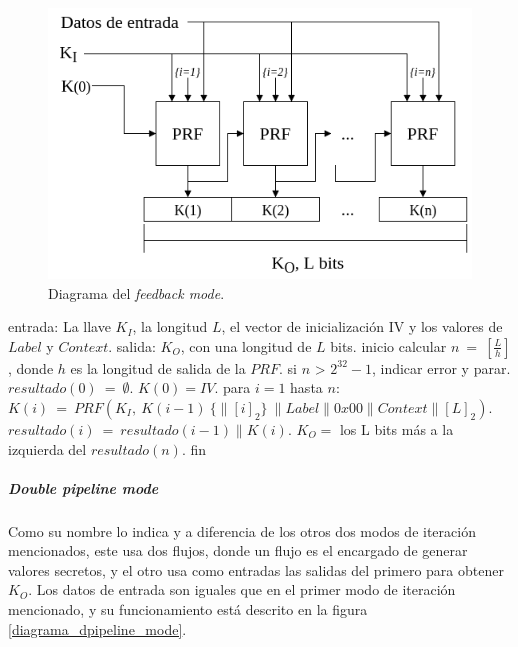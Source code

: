 \begin{figure}[H]
  \begin{center}
    \includegraphics[width=0.75\linewidth]{diagramas/feedback_mode}
    \caption{Diagrama del \textit{feedback mode}.}
    \label{diagrama_feedback_mode}
   \end{center}
\end{figure}

\begin{pseudocodigo}[caption={Funcionamiento del \textit{feedback mode}.}, 
label={mi:2}]
  entrada:   La llave $K_I$, la longitud $L$, el vector de inicialización IV 
             y los valores de $Label$ y $Context$.
  salida:    $K_O$, con una longitud de $L$ bits.
  inicio
    calcular $n\: =\: [\frac{L}{h}]$, donde $h$ es la longitud de salida de la $PRF$.
    si $n$ > $2^{32}-1$, indicar error y parar.
    $resultado(0)\: =\: \emptyset$.
    $K(0) = IV$.
    para $i=1$ hasta $n$:
      $K(i)\: = \:PRF(K_I,\: K(i-1)\: \{\parallel {[i]}_2\}\: \parallel Label \parallel 0x00 \parallel Context \parallel {[L]}_2 )$.
      $resultado(i)\: =\: resultado(i-1) \parallel K(i)$.
    $K_O =$ los L bits más a la izquierda del $resultado(n)$. 
  fin
\end{pseudocodigo}

\subparagraph{Double pipeline mode}
Como su nombre lo indica y a diferencia de los otros dos modos de iteración 
mencionados, este usa dos flujos, donde un flujo es el encargado de generar 
valores secretos, y el otro usa como entradas las salidas del primero para 
obtener $K_O$. Los datos de entrada son iguales que en el primer modo de 
iteración mencionado, y su funcionamiento está descrito en la figura 
\ref{diagrama_dpipeline_mode}.

